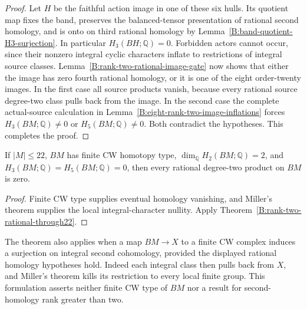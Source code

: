 \begin{proof}
Let $H$ be the faithful action image in one of these six hulls.
Its quotient map fixes the band, preserves the balanced-tensor
presentation of rational second homology, and is onto on third
rational homology by Lemma~\ref{B:band-quotient-H3-surjection}.
In particular $H_3(BH;\mathbb Q)=0$. Forbidden actors cannot
occur, since their nonzero integral cyclic characters inflate
to restrictions of integral source classes.
Lemma~\ref{B:rank-two-rational-image-gate} now shows that either
the image has zero fourth rational homology, or it is one of the
eight order-twenty images. In the first case all source products
vanish, because every rational source degree-two class pulls
back from the image. In the second case the complete actual-source
calculation in Lemma~\ref{B:eight-rank-two-image-inflations}
forces $H_3(BM;\mathbb Q)\ne0$ or $H_5(BM;\mathbb Q)\ne0$.
Both contradict the hypotheses. This completes the proof.
\end{proof}

\begin{corollary}\label{B:finite-CW-rank-two-rational22}
If $|M|\leq22$, $BM$ has finite CW homotopy type,
$\dim_{\mathbb Q}H_2(BM;\mathbb Q)=2$, and
$H_3(BM;\mathbb Q)=H_5(BM;\mathbb Q)=0$, then every rational
degree-two product on $BM$ is zero.
\end{corollary}
\begin{proof}
Finite CW type supplies eventual homology vanishing, and
Miller's theorem supplies the local integral-character nullity.
Apply Theorem~\ref{B:rank-two-rational-through22}.
\end{proof}

\begin{remark}\label{B:rank-two-finite-target-scope}
The theorem also applies when a map $BM\to X$ to a finite CW
complex induces a surjection on integral second cohomology,
provided the displayed rational homology hypotheses hold.
Indeed each integral class then pulls back from $X$, and
Miller's theorem kills its restriction to every local finite
group. This formulation asserts neither finite CW type of
$BM$ nor a result for second-homology rank greater than two.
\end{remark}
